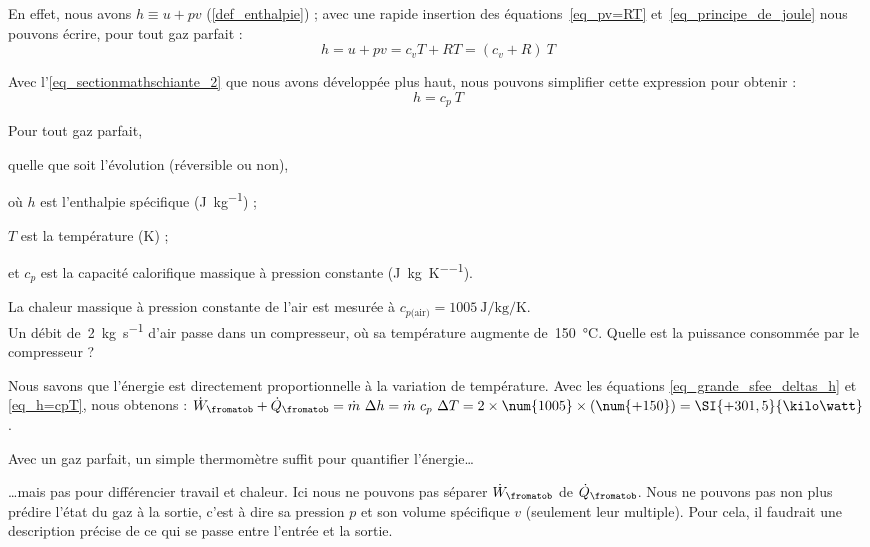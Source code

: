 		En effet, nous avons $h \equiv u + p v$ (\ref{def_enthalpie}) ; avec une rapide insertion des équations~\ref{eq_pv=RT} et~\ref{eq_principe_de_joule} nous pouvons écrire, pour tout gaz parfait :
			\begin{equation}
				h = u + p v = c_v T + R T = (c_v + R) \ T
				\label{eq_h_fonction_de_T}
			\end{equation}

		Avec l’\cref{eq_sectionmathschiante_2} que nous avons développée plus haut, nous pouvons simplifier cette expression pour obtenir :
			\begin{equation}
				h = c_p \ T
				\label{eq_h=cpT}
			\end{equation}
			\begin{equationterms}
				\item Pour tout gaz parfait,
				\item quelle que soit l’évolution (réversible ou non),
				\item où \tab $h$ 	\tab est l’enthalpie spécifique (\si{\joule\per\kilogram}) ;
				\item 	\tab $T$ 	\tab est la température (\si{\kelvin}) ;
				\item et \tab $c_p$ 	\tab est la capacité calorifique massique à pression constante (\si{\joule\per\kilogram\per\kelvin}).
			\end{equationterms}
		
		
		\begin{anexample}
			La chaleur massique à pression constante de l’air est mesurée à $c_{p\text{(air)}} = \SI{1005}{\joule\per\kilogram\per\kelvin}$.\\
			Un débit de~\SI{2}{\kilogram\per\second} d’air passe dans un compresseur, où sa température augmente de~\SI{150}{\degreeCelsius}. Quelle est la puissance consommée par le compresseur ?
				\begin{answer}
					Nous savons que l’énergie est directement proportionnelle à la variation de température. Avec les équations \ref{eq_grande_sfee_deltas_h} et \ref{eq_h=cpT}, nous obtenons : $\dot W_\fromatob + \dot Q_\fromatob = \dot m \ \Delta h = \dot m \ c_p \ \Delta T = 2 \times \num{1005} \times (\num{+150}) = \SI{+301,5}{\kilo\watt}$.
				\end{answer}
					\begin{remark}Avec un gaz parfait, un simple thermomètre suffit pour quantifier l’énergie…\end{remark}
					\begin{remark}…mais pas pour différencier travail et chaleur. Ici nous ne pouvons pas séparer $\dot W_\fromatob$ de $\dot Q_\fromatob$. Nous ne pouvons pas non plus prédire l’état du gaz à la sortie, c’est à dire sa pression $p$ et son volume spécifique $v$ (seulement leur multiple). Pour cela, il faudrait une description précise de ce qui se passe entre l’entrée et la sortie.\end{remark}
		\end{anexample}


